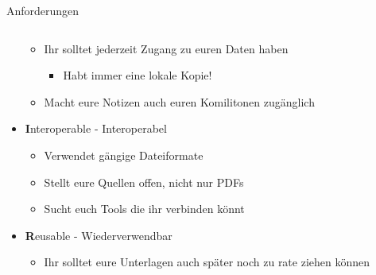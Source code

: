 \documentclass[aspectratio=169,shownotes]{beamer}
\begin{document}
\begin{frame}{Anforderungen}
\begin{columns}[t]
\begin{column}[t]{0.69\textwidth}
\begin{itemize}
                \begin{itemize}
                    \item Ihr solltet jederzeit Zugang zu euren Daten haben
                    \begin{itemize}
                        \item Habt immer eine lokale Kopie!
                    \end{itemize}
                \item Macht eure Notizen auch euren Komilitonen zugänglich
            \end{itemize}
                \item[] \textbf{I}nteroperable - Interoperabel
                \begin{itemize}
                    \item Verwendet gängige Dateiformate
                    \item Stellt eure Quellen offen, nicht nur PDFs
                    \item Sucht euch Tools die ihr verbinden könnt
                \end{itemize}
                \item[] \textbf{R}eusable - Wiederverwendbar
                \begin{itemize}
                    \item Ihr solltet eure Unterlagen auch später noch zu rate ziehen können
                \end{itemize}
            \end{itemize}
        \end{column}
    \end{columns}  
\end{frame}
\end{document}

